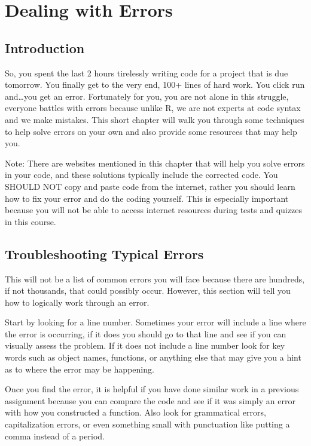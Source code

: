\documentclass[
]{book}
\begin{document}
\hypertarget{dealing-with-errors}{%
\chapter{Dealing with Errors}\label{dealing-with-errors}}

\hypertarget{introduction-6}{%
\section{Introduction}\label{introduction-6}}

So, you spent the last 2 hours tirelessly writing code for a project that is due tomorrow. You finally get to the very end, 100+ lines of hard work. You click run and\ldots you get an error. Fortunately for you, you are not alone in this struggle, everyone battles with errors because unlike R, we are not experts at code syntax and we make mistakes. This short chapter will walk you through some techniques to help solve errors on your own and also provide some resources that may help you.

Note: There are websites mentioned in this chapter that will help you solve errors in your code, and these solutions typically include the corrected code. You SHOULD NOT copy and paste code from the internet, rather you should learn how to fix your error and do the coding yourself. This is especially important because you will not be able to access internet resources during tests and quizzes in this course.

\hypertarget{troubleshooting-typical-errors}{%
\section{Troubleshooting Typical Errors}\label{troubleshooting-typical-errors}}

This will not be a list of common errors you will face because there are hundreds, if not thousands, that could possibly occur. However, this section will tell you how to logically work through an error.

Start by looking for a line number. Sometimes your error will include a line where the error is occurring, if it does you should go to that line and see if you can visually assess the problem. If it does not include a line number look for key words such as object names, functions, or anything else that may give you a hint as to where the error may be happening.

Once you find the error, it is helpful if you have done similar work in a previous assignment because you can compare the code and see if it was simply an error with how you constructed a function. Also look for grammatical errors, capitalization errors, or even something small with punctuation like putting a comma instead of a period.
\end{document}

